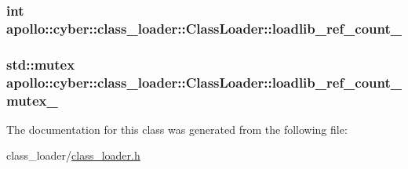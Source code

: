 \hypertarget{classapollo_1_1cyber_1_1class__loader_1_1ClassLoader_aa60b8b3da81bcfb874e6c5202522409f}{
\subsubsection[{loadlib\-\_\-ref\-\_\-count\-\_\-}]{\setlength{\rightskip}{0pt plus 5cm}int apollo\-::cyber\-::class\-\_\-loader\-::\-Class\-Loader\-::loadlib\-\_\-ref\-\_\-count\-\_\-\hspace{0.3cm}{\ttfamily [private]}}}\label{classapollo_1_1cyber_1_1class__loader_1_1ClassLoader_aa60b8b3da81bcfb874e6c5202522409f}
\hypertarget{classapollo_1_1cyber_1_1class__loader_1_1ClassLoader_adb3ba15dcff9f555885bcaf4be5f737d}{
\subsubsection[{loadlib\-\_\-ref\-\_\-count\-\_\-mutex\-\_\-}]{\setlength{\rightskip}{0pt plus 5cm}std\-::mutex apollo\-::cyber\-::class\-\_\-loader\-::\-Class\-Loader\-::loadlib\-\_\-ref\-\_\-count\-\_\-mutex\-\_\-\hspace{0.3cm}{\ttfamily [private]}}}\label{classapollo_1_1cyber_1_1class__loader_1_1ClassLoader_adb3ba15dcff9f555885bcaf4be5f737d}


The documentation for this class was generated from the following file\-:\begin{DoxyCompactItemize}
\item 
class\-\_\-loader/\hyperlink{class__loader_8h}{class\-\_\-loader.\-h}\end{DoxyCompactItemize}
